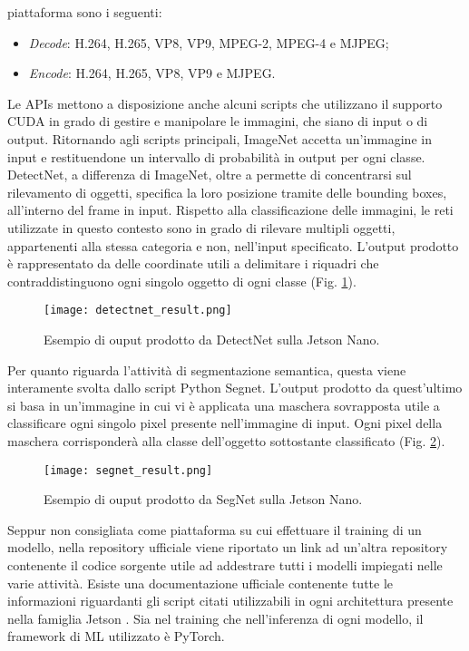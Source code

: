 piattaforma sono i seguenti:
\begin{itemize}
    \item \emph{Decode}: H.264, H.265, VP8, VP9, MPEG-2, MPEG-4 e MJPEG;
    \item \emph{Encode}: H.264, H.265, VP8, VP9 e MJPEG.
\end{itemize}
Le APIs mettono a disposizione anche alcuni scripts che utilizzano il supporto 
CUDA in grado di gestire e manipolare le immagini, che siano di input o 
di output. Ritornando agli scripts principali, ImageNet accetta un'immagine 
in input e restituendone un intervallo di probabilità in output per ogni classe. 
DetectNet, a differenza di ImageNet, oltre a permette di concentrarsi sul rilevamento 
di oggetti, specifica la loro posizione tramite delle bounding boxes, 
all'interno del frame in input. Rispetto alla classificazione delle immagini, 
le reti utilizzate in questo contesto sono in grado di rilevare multipli oggetti, 
appartenenti alla stessa categoria e non, nell'input specificato. L'output 
prodotto è rappresentato da delle coordinate utili a delimitare i riquadri che 
contraddistinguono ogni singolo oggetto di ogni classe (Fig. \ref{detectnet_result}).
\begin{figure}
    \centering
    \texttt{[image: detectnet\_result.png]}
    \centering
    \caption{Esempio di ouput prodotto da DetectNet sulla Jetson Nano.}
    \label{detectnet_result}
\end{figure}
Per quanto 
riguarda l'attività di segmentazione semantica, questa viene interamente 
svolta dallo script Python Segnet. L'output prodotto da quest'ultimo si 
basa in un'immagine in cui vi è applicata una maschera sovrapposta utile a 
classificare ogni singolo pixel presente nell'immagine di input. Ogni pixel 
della maschera corrisponderà alla classe dell'oggetto sottostante classificato 
(Fig. \ref{segnet_result}).
\begin{figure}
    \centering
    \texttt{[image: segnet\_result.png]}
    \centering
    \caption{Esempio di ouput prodotto da SegNet sulla Jetson Nano.}
    \label{segnet_result}
\end{figure}
Seppur non consigliata come piattaforma su cui effettuare il 
training di un modello, nella repository ufficiale \cite{repo_jetson_nano} viene riportato un link ad 
un'altra repository \cite{repo_pytorch_training} contenente il codice sorgente utile ad addestrare tutti 
i modelli impiegati nelle varie attività. Esiste una documentazione ufficiale 
contenente tutte le informazioni riguardanti gli script citati utilizzabili in 
ogni architettura presente nella famiglia Jetson \cite{Documentation_jetson}. Sia nel training che 
nell'inferenza di ogni modello, il framework di ML utilizzato è PyTorch.

